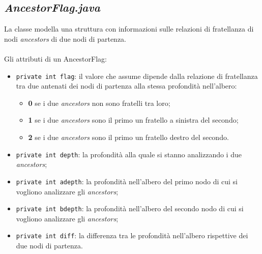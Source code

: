 \documentclass[a4paper,11pt]{report}
\begin{document}
\subsection{\emph{AncestorFlag.java}}
La classe modella una struttura con informazioni sulle relazioni di fratellanza di nodi \emph{ancestors} di due nodi di partenza.
\\\\
Gli attributi di un AncestorFlag:
\begin{itemize}
 \item \verb|private int flag|: il valore che assume dipende dalla relazione di fratellanza tra due antenati dei nodi di partenza alla
stessa profondità nell'albero:
 \begin{itemize}
  \item \textbf{0} se i due \emph{ancestors} non sono fratelli tra loro;
  \item \textbf{1} se i due \emph{ancestors} sono il primo un fratello a sinistra del secondo;
  \item \textbf{2} se i due \emph{ancestors} sono il primo un fratello destro del secondo. 
 \end{itemize}
 \item \verb|private int depth|: la profondità alla quale si stanno analizzando i due \emph{ancestors};
 \item \verb|private int adepth|: la profondità nell'albero del primo nodo di cui si vogliono analizzare gli \emph{ancestors};
 \item \verb|private int bdepth|: la profondità nell'albero del secondo nodo di cui si vogliono analizzare gli \emph{ancestors};
 \item \verb|private int diff|: la differenza tra le profondità nell'albero rispettive dei due nodi di partenza.
\end{itemize}
\end{document}

